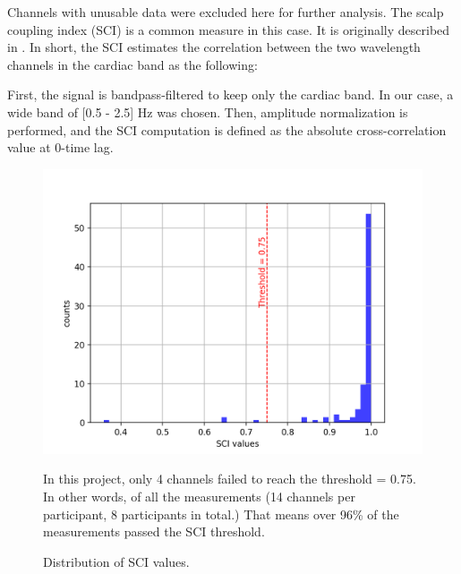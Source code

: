 Channels with unusable data were excluded here for further analysis. The scalp coupling index (SCI) is a common measure in this case. It is originally described in \cite {polloniniSCI}. In short, the SCI estimates the correlation between the two wavelength channels in the cardiac band as the following:

First, the signal is bandpass-filtered to keep only the cardiac band. In our case, a wide band of [0.5 - 2.5] Hz was chosen. Then, amplitude normalization is performed, and the SCI computation is defined as the absolute cross-correlation value at 0-time lag.


\begin{figure}[H]
  \centering
    \includegraphics[scale=.75]{bilder/SCI_hist.png}
  \caption{Distribution of SCI values.}
   \label{fig:somesignal}
    \medskip
     \small {In this project, only 4 channels failed to reach the threshold = 0.75. In other words, of all the measurements (14 channels per participant, 8 participants in total.) That means over 96\% of the measurements passed the SCI threshold.}
 
\end{figure}




